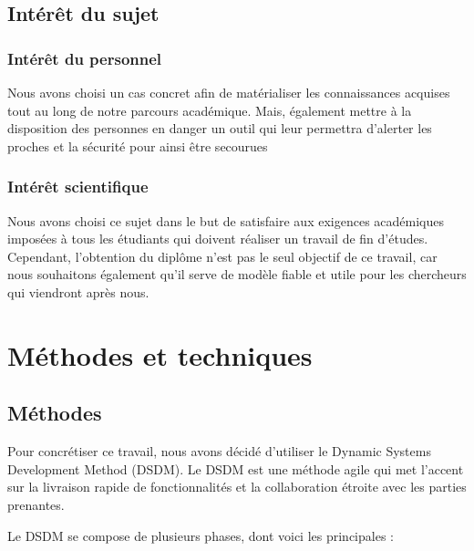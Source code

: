 \subsection{Intérêt du sujet}

	\subsubsection{Intérêt du personnel}
	
	Nous avons choisi un cas concret afin de matérialiser les connaissances acquises tout au long de notre parcours académique. Mais, également mettre à la disposition des personnes en danger un outil qui leur permettra d’alerter les proches et la sécurité pour ainsi être secourues
	
	\subsubsection{Intérêt scientifique}
	
	Nous avons choisi ce sujet dans le but de satisfaire aux exigences académiques imposées à tous les étudiants qui doivent réaliser un travail de fin d'études. Cependant, l'obtention du diplôme n'est pas le seul objectif de ce travail, car nous souhaitons également qu'il serve de modèle fiable et utile pour les chercheurs qui viendront après nous.

\section{Méthodes et techniques}
\subsection{Méthodes}

Pour concrétiser ce travail, nous avons décidé d'utiliser le Dynamic Systems Development Method (DSDM). Le DSDM est une méthode agile qui met l'accent sur la livraison rapide de fonctionnalités et la collaboration étroite avec les parties prenantes.

Le DSDM se compose de plusieurs phases, dont voici les principales :

